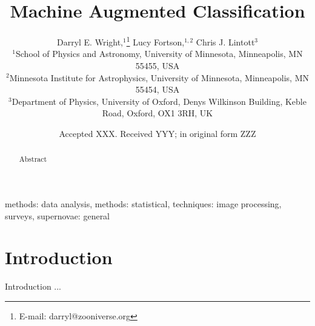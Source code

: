 \documentclass[a4paper,fleqn,usenatbib]{mnras}
\title[Machine Augmented Classification]{Machine Augmented Classification}
\author[D.E. Wright, L. Fortson, C. J. Lintott]{Darryl E. Wright,$^{1}$\thanks{E-mail: darryl@zooniverse.org}
Lucy Fortson,$^{1,2}$
Chris J. Lintott$^{3}$
\\
$^{1}$School of Physics and Astronomy, University of Minnesota, Minneapolis, MN 55455, USA\\
$^{2}$Minnesota Institute for Astrophysics, University of Minnesota, Minneapolis, MN 55454, USA \\
$^{3}$Department of Physics, University of Oxford, Denys Wilkinson Building, Keble Road, Oxford, OX1 3RH, UK \\
}
\date{Accepted XXX. Received YYY; in original form ZZZ}
\begin{document}
\label{firstpage}
\pagerange{\pageref{firstpage}--\pageref{lastpage}}
\maketitle

\begin{abstract}
Abstract
\end{abstract}

\begin{keywords}
methods: data analysis, methods: statistical, techniques: image processing, surveys, supernovae: general
\end{keywords}



\section{Introduction}

Introduction ...
\end{document}

